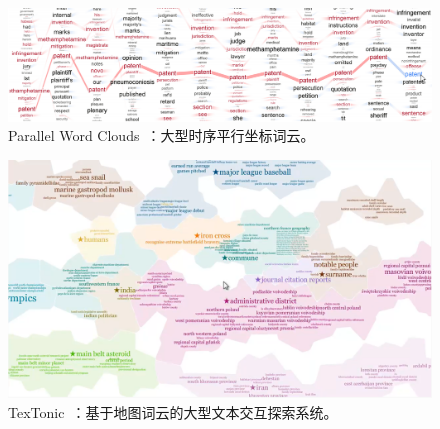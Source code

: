 \begin{figure}[htbp]
	\centering
	\includegraphics[width=\textwidth]{figures/parallel.png}
	\caption{Parallel Word Clouds~\supercite{Collins2009}：大型时序平行坐标词云。}
	\label{fig:textonic}
\end{figure}

\begin{figure}[htbp]
	\centering
	\includegraphics[width=\textwidth]{figures/TexTonic.png}
	\caption{TexTonic~\supercite{Paul2019}：基于地图词云的大型文本交互探索系统。}
	\label{fig:textonic}
\end{figure}
